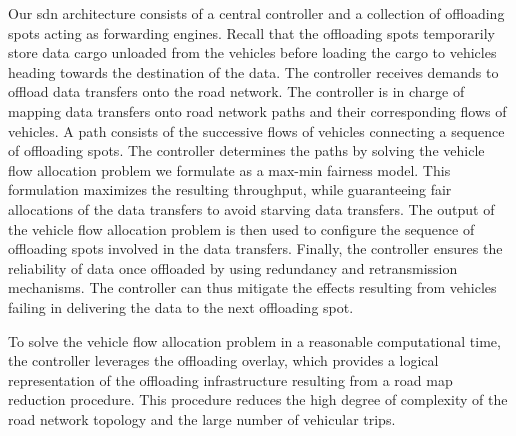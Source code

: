 Our \acrshort{sdn} architecture consists of a central controller and a collection of offloading spots acting as forwarding engines. Recall that the offloading spots temporarily store data cargo unloaded from the vehicles before loading the cargo to vehicles heading towards the destination of the data. The controller receives demands to offload data transfers onto the road network. 
The controller is in charge of mapping data transfers onto road network paths and their corresponding flows of vehicles. A path consists of the successive flows of vehicles connecting a sequence of offloading spots. The controller determines the paths by solving the vehicle flow allocation problem we formulate as a max-min fairness model. This formulation maximizes the resulting throughput, while guaranteeing fair allocations of the data transfers to avoid starving data transfers. The output of the vehicle flow allocation problem is then used to configure the sequence of offloading spots involved in the data transfers. 
Finally, the controller ensures the reliability of data once offloaded by using redundancy and retransmission mechanisms. The controller can thus mitigate the effects resulting from vehicles failing in delivering the data to the next offloading spot. 

To solve the vehicle flow allocation problem in a reasonable computational time, the controller leverages the offloading overlay, which provides a logical representation of the offloading infrastructure resulting from a road map reduction procedure. This procedure reduces the high degree of complexity of the road network topology and the large number of vehicular trips. 


